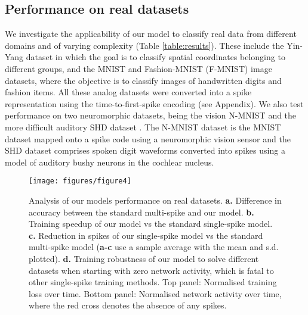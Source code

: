 \documentclass{article} \usepackage{iclr2023_conference,times}
\begin{document}
\subsection{Performance on real datasets} 
We investigate the applicability of our model to classify real data from different domains and of varying complexity (Table \ref{table:results}). These include the Yin-Yang dataset \citep{kriener2022yin} in which the goal is to classify spatial coordinates belonging to different groups, and the MNIST \citep{lecun1998mnist} and Fashion-MNIST (F-MNIST) \citep{xiao2017fashion} image datasets, where the objective is to classify images of handwritten digits and fashion items. All these analog datasets were converted into a spike representation using the time-to-first-spike encoding (see Appendix). We also test performance on two neuromorphic datasets, being the vision N-MNIST \citep{orchard2015converting} and the more difficult auditory SHD dataset \citep{cramer2020heidelberg}. The N-MNIST dataset is the MNIST dataset mapped onto a spike code using a neuromorphic vision sensor and the SHD dataset comprises spoken digit waveforms converted into spikes using a model of auditory bushy neurons in the cochlear nucleus.

\begin{figure}[h!]
    \texttt{[image: figures/figure4]}
	\centering
	\caption{Analysis of our models performance on real datasets. \textbf{a.} Difference in accuracy between the standard multi-spike and our model. \textbf{b.} Training speedup of our model vs the standard single-spike model. \textbf{c.} Reduction in spikes of our single-spike model vs the standard multi-spike model (\textbf{a-c} use a  sample average with the mean and s.d. plotted). \textbf{d.} Training robustness of our model to solve different datasets when starting with zero network activity, which is fatal to other single-spike training methods. Top panel: Normalised training loss over time. Bottom panel: Normalised network activity over time, where the red cross denotes the absence of any spikes.}
	\label{fig:datasets}
\end{figure}
\end{document}
